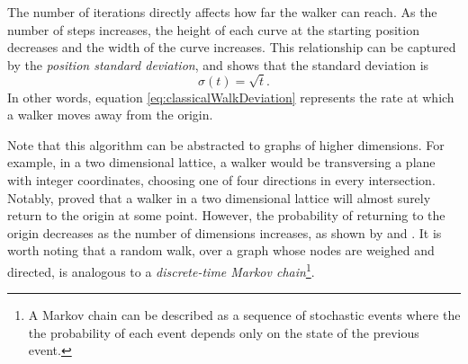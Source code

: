\documentclass[../../dissertation.tex]{subfiles}
\begin{document}
The number of iterations directly affects how far the walker can reach. As the number of
steps increases, the height of each curve at the starting position decreases
and the width of the curve increases. This relationship can be captured by the
\textit{position standard deviation}, and \cite{REN1} shows that the standard
deviation is
\begin{equation}
	\sigma(t) = \sqrt{t}.
	\label{eq:classicalWalkDeviation}
\end{equation}
In other words, equation \ref{eq:classicalWalkDeviation} represents the rate at
which a walker moves away from the origin.\par
Note that this algorithm can be abstracted to graphs of higher dimensions. For
example, in a two dimensional lattice, a walker would be transversing a plane
with integer coordinates, choosing one of four directions in every
intersection. Notably, \cite{polya1921} proved that a walker in a two
dimensional lattice will almost surely return to the origin at some point.
However, the probability of returning to the origin decreases as the number of
dimensions increases, as shown by \cite{montrol1956} and \cite{finch2003}.
It is worth noting that a random walk, over a graph whose nodes are weighed and
directed, is analogous to a \textit{discrete-time Markov chain}\footnote{A
Markov chain can be described as a sequence of stochastic events where the the
probability of each event depends only on the state of the previous
event.}.
\end{document}

